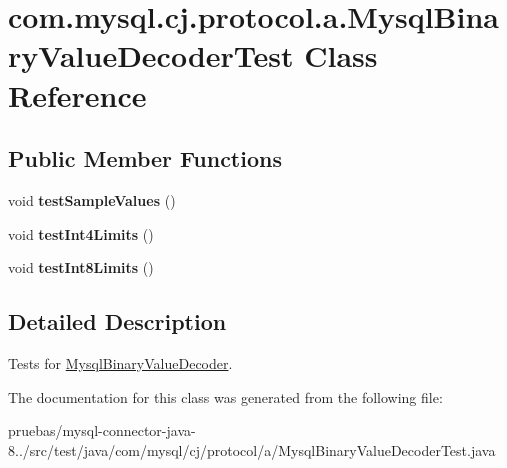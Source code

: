 \hypertarget{classcom_1_1mysql_1_1cj_1_1protocol_1_1a_1_1_mysql_binary_value_decoder_test}{}\section{com.\+mysql.\+cj.\+protocol.\+a.\+Mysql\+Binary\+Value\+Decoder\+Test Class Reference}
\label{classcom_1_1mysql_1_1cj_1_1protocol_1_1a_1_1_mysql_binary_value_decoder_test}
\subsection*{Public Member Functions}
\begin{DoxyCompactItemize}
\item 
\mbox{\label{classcom_1_1mysql_1_1cj_1_1protocol_1_1a_1_1_mysql_binary_value_decoder_test_a9e3bd4549052927f558adc3104ff8ecf}} 
void {\bfseries test\+Sample\+Values} ()
\item 
\mbox{\label{classcom_1_1mysql_1_1cj_1_1protocol_1_1a_1_1_mysql_binary_value_decoder_test_aa3091225072ba24e8fb4ac55370be682}} 
void {\bfseries test\+Int4\+Limits} ()
\item 
\mbox{\label{classcom_1_1mysql_1_1cj_1_1protocol_1_1a_1_1_mysql_binary_value_decoder_test_aaaf3824628e10b446d5b66599f602820}} 
void {\bfseries test\+Int8\+Limits} ()
\end{DoxyCompactItemize}


\subsection{Detailed Description}
Tests for \mbox{\hyperlink{classcom_1_1mysql_1_1cj_1_1protocol_1_1a_1_1_mysql_binary_value_decoder}{Mysql\+Binary\+Value\+Decoder}}. 

The documentation for this class was generated from the following file\+:\begin{DoxyCompactItemize}
\item 
pruebas/mysql-\/connector-\/java-\/8../src/test/java/com/mysql/cj/protocol/a/Mysql\+Binary\+Value\+Decoder\+Test.\+java\end{DoxyCompactItemize}

